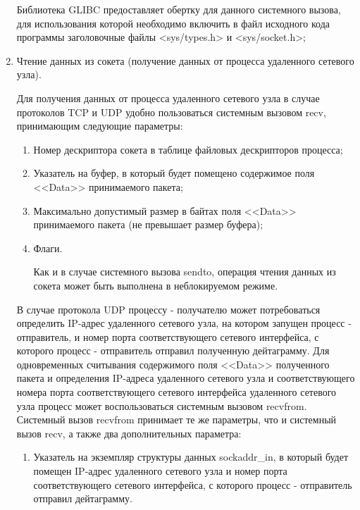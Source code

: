 \begin{enumerate}
			Библиотека GLIBC предоставляет обертку для данного системного вызова, для использования которой необходимо включить в файл исходного кода программы
			заголовочные файлы <sys/types.h> и <sys/socket.h>;

		\item Чтение данных из сокета (получение данных от процесса удаленного сетевого узла).

			Для получения данных от процесса удаленного сетевого узла в случае протоколов TCP и UDP удобно пользоваться системным вызовом recv,
			принимающим следующие параметры:

			\begin{enumerate}

				\item Номер дескриптора сокета в таблице файловых дескрипторов процесса;
				\item Указатель на буфер, в который будет помещено содержимое поля <<Data>> принимаемого пакета;
				\item Максимально допустимый размер в байтах поля <<Data>> принимаемого пакета (не превышает размер буфера);
				\item Флаги.
					
					Как и в случае системного вызова sendto, операция чтения данных из сокета может быть выполнена в неблокируемом режиме.

			\end{enumerate}

			В случае протокола UDP процессу - получателю может потребоваться определить IP-адрес удаленного сетевого узла, на котором запущен
			процесс - отправитель, и номер порта соответствующего сетевого интерфейса, с которого процесс - отправитель отправил полученную дейтаграмму.
			Для одновременных считывания содержимого поля <<Data>> полученного пакета и определения IP-адреса удаленного сетевого узла и соответствующего
			номера порта соответствующего сетевого интерфейса удаленного сетевого узла процесс может воспользоваться системным вызовом recvfrom.
			Системный вызов recvfrom принимает те же параметры, что и системный вызов recv, а также два дополнительных параметра:

			\begin{enumerate}

				\item Указатель на экземпляр структуры данных sockaddr\_in, в который будет помещен
				IP-адрес удаленного сетевого узла и номер порта соответствующего сетевого интерфейса,
				с которого процесс - отправитель отправил дейтаграмму.


\end{enumerate}
\end{enumerate}
